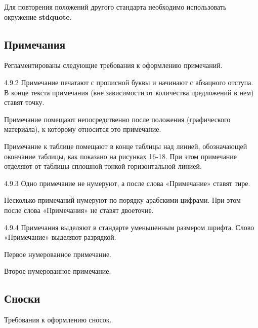 \documentclass[12pt, twoside, final]{ruost}
\begin{document}
\begin{OST}
				\point Для повторения положений другого стандарта необходимо использовать окружение \textbf{stdquote}.
				
			\subsection{Примечания}
			
				\point Регламентированы следующие требования к оформлению примечаний.
				
				\begin{stdquote}
					\par 4.9.2 Примечание печатают с прописной буквы и начинают с абзацного отступа. В конце текста примечания (вне зависимости от количества предложений в нем) ставят точку.
					\par Примечание помещают непосредственно после положения (графического материала), к которому относится это примечание.
					\par Примечание к таблице помещают в конце таблицы над линией, обозначающей окончание таблицы, как показано на рисунках 16-18. При этом примечание отделяют от таблицы сплошной тонкой горизонтальной линией.
					\par 4.9.3 Одно примечание не нумеруют, а после слова «Примечание» ставят тире.
					\par Несколько примечаний нумеруют по порядку арабскими цифрами. При этом после слова «Примечания» не ставят двоеточие.
					\par 4.9.4 Примечания выделяют в стандарте уменьшенным размером шрифта. Слово «Примечание» выделяют разрядкой.
					\par [ГОСТ 1.5---2001]
				\end{stdquote}
				
				\begin{notes}
					\item Первое нумерованное примечание.
					\item Второе нумерованное примечание.
				\end{notes}
				
			\subsection{Сноски}
			
				\point Требования к оформлению сносок.
				

\end{OST}
\end{document}
